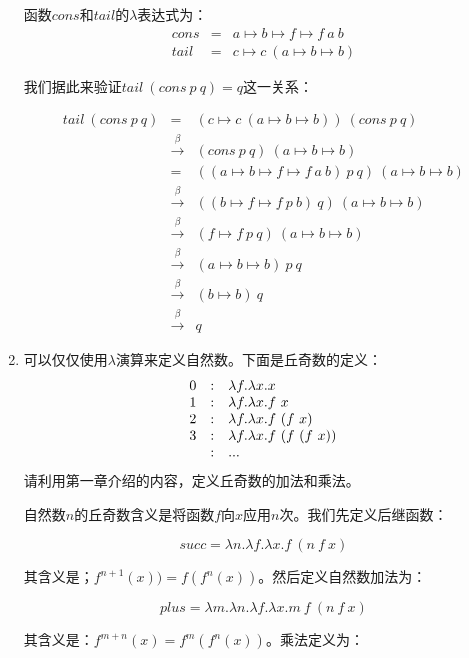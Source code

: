 \documentclass[UTF8]{article}
\begin{document}
\begin{enumerate}
函数$cons$和$tail$的$\lambda$表达式为：
\[
\begin{array}{rcl}
cons & = & a \mapsto b \mapsto f \mapsto f\ a\ b \\
tail & = & c \mapsto c\ (a \mapsto b \mapsto b)
\end{array}
\]

我们据此来验证$tail\ (cons\ p\ q) = q$这一关系：

\[
\begin{array}{rcl}
tail\ (cons\ p\ q) & = & (c \mapsto c\ (a \mapsto b \mapsto b))\ (cons\ p\ q) \\
                   & \xrightarrow{\beta} & (cons\ p\ q)\ (a \mapsto b \mapsto b) \\
                   & = & ((a \mapsto b \mapsto f \mapsto f\ a\ b)\ p\ q)\ (a \mapsto b \mapsto b) \\
                   & \xrightarrow{\beta} & ((b \mapsto f \mapsto f\ p\ b)\ q)\ (a \mapsto b \mapsto b) \\
                   & \xrightarrow{\beta} & (f \mapsto f\ p\ q)\ (a \mapsto b \mapsto b) \\
                   & \xrightarrow{\beta} & (a \mapsto b \mapsto b)\ p\ q \\
                   & \xrightarrow{\beta} & (b \mapsto b)\ q \\
                   & \xrightarrow{\beta} & q
\end{array}
\]

\item 可以仅仅使用$\lambda$演算来定义自然数。下面是丘奇数的定义：
\[
\begin{array}{r@{\quad:\quad}l}
0 & \lambda f . \lambda x . x \\
1 & \lambda f . \lambda x . f\ x \\
2 & \lambda f . \lambda x . f\ (f\ x) \\
3 & \lambda f . \lambda x . f\ (f\ (f\ x)) \\
  & ...
\end{array}
\]
请利用第一章介绍的内容，定义丘奇数的加法和乘法。

自然数$n$的丘奇数含义是将函数$f$向$x$应用$n$次。我们先定义后继函数：

\[
succ = \lambda n . \lambda f . \lambda x . f\ (n\ f\ x)
\]

其含义是；$f^{n+1}(x)) = f(f^n(x))$。然后定义自然数加法为：

\[
plus = \lambda m . \lambda n . \lambda f . \lambda x . m\ f\ (n\ f\ x)
\]

其含义是：$f^{m + n}(x) = f^m(f^n(x))$。乘法定义为：


\end{enumerate}
\end{document}

